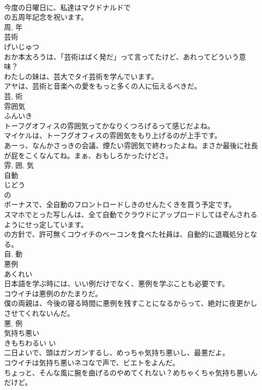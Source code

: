 \documentclass[8pt]{extreport}
\begin{document}
\begin{CJK}{UTF8}{min}
\\	今度の日曜日に、私達はマクドナルドで
\\	の五周年記念を祝います。	
\\	周, 年	
\\	芸術	
\\	げいじゅつ	
\\	おか本太ろうは、「芸術はばく発だ」って言ってたけど、あれってどういう意味？	
\\	わたしの妹は、芸大でタイ芸術を学んでいます。	
\\	アヤは、芸術と音楽への愛をもっと多くの人に伝えるべきだ。	
\\	芸, 術	
\\	雰囲気	
\\	ふんいき	
\\	トーフグオフィスの雰囲気ってかなりくつろげるって感じだよね。	
\\	マイケルは、トーフグオフィスの雰囲気をもり上げるのが上手です。	
\\	あーっ、なんかさっきの会議、煙たい雰囲気で終わったよね。まさか最後に社長が屁をこくなんてね。まぁ、おもしろかったけどさ。	
\\	雰, 囲, 気	
\\	自動	
\\	じどう	
\\	の 
\\	ボーナスで、全自動のフロントロードしきのせんたくきを買う予定です。	
\\	スマホでとった写しんは、全て自動でクラウドにアップロードしてほぞんされるようにせっ定しています。	
\\	の方針で、許可無くコウイチのベーコンを食べた社員は、自動的に退職処分となる。	
\\	自, 動	
\\	悪例	
\\	あくれい	
\\	日本語を学ぶ時には、いい例だけでなく、悪例を学ぶことも必要です。	
\\	コウイチは悪例のかたまりだ。	
\\	僕の両親は、今後の寝る時間に悪例を残すことになるからって、絶対に夜更かしさせてくれないんだ。	
\\	悪, 例	
\\	気持ち悪い	
\\	きもちわるい	い 
\\	二日よいで、頭はガンガンするし、めっちゃ気持ち悪いし、最悪だよ。	
\\	コウイチは気持ち悪いネコなで声で、ビエトをよんだ。	
\\	ちょっと、そんな風に腕を曲げるのやめてくれない？めちゃくちゃ気持ち悪いんだけど。	

\end{CJK}
\end{document}
